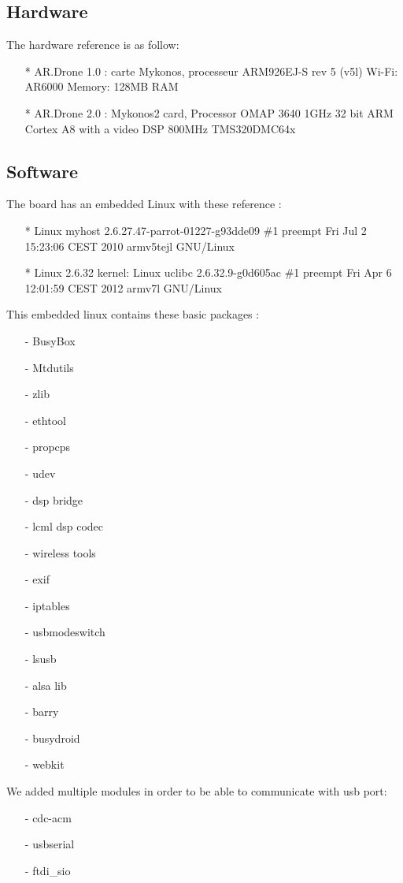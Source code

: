 \subsection{Hardware}
The hardware reference is as follow:
\begin{itemize}
\item[*] AR.Drone 1.0 : carte Mykonos, processeur ARM926EJ-S rev 5 (v5l) Wi-Fi: AR6000 Memory: 128MB RAM
\item[*] AR.Drone 2.0 : Mykonos2 card, Processor OMAP 3640 1GHz 32 bit ARM Cortex A8 with a video DSP 800MHz TMS320DMC64x
\end{itemize}

\subsection{Software}
The board has an embedded Linux with these reference : \\
\begin{itemize}
\item[*] Linux myhost 2.6.27.47-parrot-01227-g93dde09 \#1 preempt Fri Jul 2 15:23:06 CEST 2010 armv5tejl GNU/Linux 
\item[*] Linux 2.6.32 kernel: Linux uclibc 2.6.32.9-g0d605ac \#1 preempt Fri Apr 6 12:01:59 CEST 2012 armv7l GNU/Linux 
\end{itemize}
This embedded linux contains these basic packages :
\begin{itemize}
\item[-] BusyBox
\item[-] Mtdutils
\item[-] zlib
\item[-] ethtool
\item[-] propcps
\item[-] udev
\item[-] dsp bridge 
\item[-] lcml dsp codec
\item[-] wireless tools
\item[-] exif
\item[-] iptables
\item[-] usbmodeswitch
\item[-] lsusb
\item[-] alsa lib
\item[-] barry
\item[-] busydroid
\item[-] webkit
\end{itemize}

We added multiple modules in order to be able to communicate with usb port:
\begin{itemize}
\item[-] cdc-acm 
\item[-] usbserial
\item[-] ftdi\_sio
\end{itemize}

